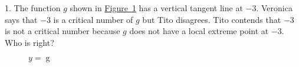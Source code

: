 \documentclass[12pt,]{book}
\theoremstyle{plain}
\theoremstyle{definition}
\numberwithin{equation}{section}
\providecommand\phantomsection{}
\newcommand{\fe}[2]{\mathop{{#1}{\left(#2\right)}}}
\begin{document}
\begin{multicols}{2}
\begin{exerciselist}
\item[1.]\phantomsection\hypertarget{exercise-3}{\null}The function \(g\) shown in \hyperref[figure-vertical-moment]{Figure~\ref*{figure-vertical-moment}} has a vertical tangent line at \(-3\).  Veronica says that \(-3\) is a critical number of \(g\) but Tito disagrees. Tito contends that \(-3\) is not a critical number because \(g\) does not have a local extreme point at \(-3\).  Who is right?%
\vfill
\columnbreak
\begin{figure}
\centering
{
}
\caption{\(y=\fe{g}{x}\)\label{figure-vertical-moment}}
\end{figure}
\par\smallskip
\end{exerciselist}
\end{multicols}%
\end{document}
